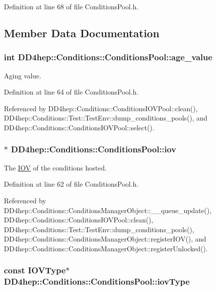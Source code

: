 Definition at line 68 of file ConditionsPool.h.

\subsection{Member Data Documentation}
\hypertarget{class_d_d4hep_1_1_conditions_1_1_conditions_pool_af75e42540703ef23e16c26a5655f2319}{
\subsubsection[{age\_\-value}]{\setlength{\rightskip}{0pt plus 5cm}int {\bf DD4hep::Conditions::ConditionsPool::age\_\-value}}}
\label{class_d_d4hep_1_1_conditions_1_1_conditions_pool_af75e42540703ef23e16c26a5655f2319}


Aging value. 

Definition at line 64 of file ConditionsPool.h.

Referenced by DD4hep::Conditions::ConditionsIOVPool::clean(), DD4hep::Conditions::Test::TestEnv::dump\_\-conditions\_\-pools(), and DD4hep::Conditions::ConditionsIOVPool::select().\hypertarget{class_d_d4hep_1_1_conditions_1_1_conditions_pool_a5c86deb9085a420b2d8355ca835f3fc9}{
\subsubsection[{iov}]{$\ast$ {\bf DD4hep::Conditions::ConditionsPool::iov}}}
\label{class_d_d4hep_1_1_conditions_1_1_conditions_pool_a5c86deb9085a420b2d8355ca835f3fc9}


The \hyperlink{class_d_d4hep_1_1_i_o_v}{IOV} of the conditions hosted. 

Definition at line 62 of file ConditionsPool.h.

Referenced by DD4hep::Conditions::ConditionsManagerObject::\_\-\_\-queue\_\-update(), DD4hep::Conditions::ConditionsIOVPool::clean(), DD4hep::Conditions::Test::TestEnv::dump\_\-conditions\_\-pools(), DD4hep::Conditions::ConditionsManagerObject::registerIOV(), and DD4hep::Conditions::ConditionsManagerObject::registerUnlocked().\hypertarget{class_d_d4hep_1_1_conditions_1_1_conditions_pool_a517c78c83270296921430bbd85ab1782}{
\subsubsection[{iovType}]{\setlength{\rightskip}{0pt plus 5cm}const {\bf IOVType}$\ast$ {\bf DD4hep::Conditions::ConditionsPool::iovType}}}
\label{class_d_d4hep_1_1_conditions_1_1_conditions_pool_a517c78c83270296921430bbd85ab1782}


